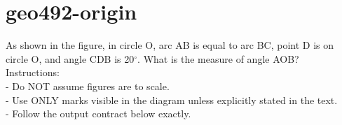 \documentclass[12pt]{article}
\begin{document}
\section*{geo492-origin}
\noindent\begin{minipage}{\textwidth}
\setlength{\parskip}{4pt}
As shown in the figure, in circle O, arc AB is equal to arc BC, point D is on circle O, and angle CDB is 20\ensuremath{^\circ}. What is the measure of angle AOB?\\
Instructions:\\
- Do NOT assume figures are to scale.\\
- Use ONLY marks visible in the diagram unless explicitly stated in the text.\\
- Follow the output contract below exactly.\\
\end{minipage}
\end{document}
